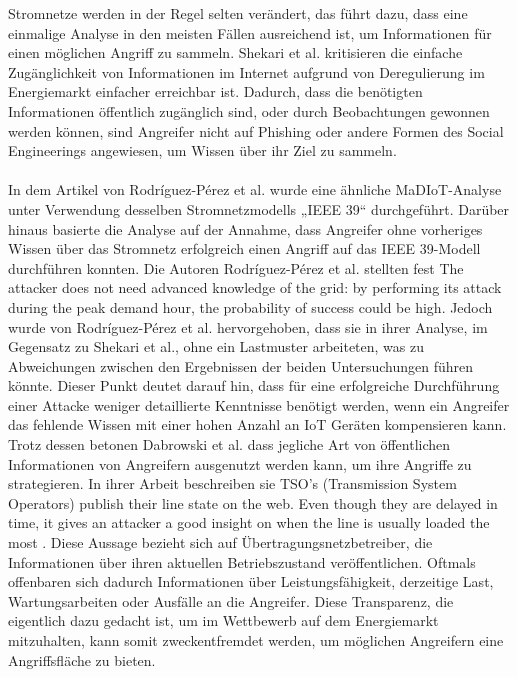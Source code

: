 \documentclass[
    a4paper,
    pagesize,
	pdftex,
    12pt,
]{scrartcl}
\begin{document}
\begin{multicols}{2}
Stromnetze werden in der Regel selten verändert, das führt dazu, dass eine einmalige Analyse in den meisten Fällen ausreichend ist, um Informationen für einen möglichen Angriff zu sammeln. Shekari et al. kritisieren die einfache Zugänglichkeit von Informationen im Internet aufgrund von Deregulierung im Energiemarkt einfacher erreichbar ist\cite{280016}. Dadurch, dass die benötigten Informationen öffentlich zugänglich sind, oder durch Beobachtungen gewonnen werden können, sind Angreifer nicht auf Phishing oder andere Formen des Social Engineerings angewiesen, um Wissen über ihr Ziel zu sammeln.\\ \\In dem Artikel von Rodríguez-Pérez et al. wurde eine ähnliche MaDIoT-Analyse unter Verwendung desselben Stromnetzmodells „IEEE 39“ durchgeführt. Darüber hinaus basierte die Analyse auf der Annahme, dass Angreifer ohne vorheriges Wissen über das Stromnetz erfolgreich einen Angriff auf das IEEE 39-Modell durchführen konnten\cite{Confronting_the_Threat}. Die Autoren Rodríguez-Pérez et al. stellten fest \glqq The attacker does not need advanced knowledge of the grid: by performing its attack during the peak demand hour, the probability of success could be high\grqq{}\cite{Confronting_the_Threat}. Jedoch wurde von Rodríguez-Pérez et al. hervorgehoben, dass sie in ihrer Analyse, im Gegensatz zu Shekari et al., ohne ein Lastmuster arbeiteten, was zu Abweichungen zwischen den Ergebnissen der beiden Untersuchungen führen könnte. Dieser Punkt deutet darauf hin, dass für eine erfolgreiche Durchführung einer Attacke weniger detaillierte Kenntnisse benötigt werden, wenn ein Angreifer das fehlende Wissen mit einer hohen Anzahl an IoT Geräten kompensieren kann. Trotz dessen betonen Dabrowski et al. dass jegliche Art von öffentlichen Informationen von Angreifern ausgenutzt werden kann, um ihre Angriffe zu strategieren.\cite{inproceedings} In ihrer Arbeit beschreiben sie \glqq TSO’s (Transmission System Operators) publish their line state on the web. Even though they are delayed in time, it gives an attacker a good insight on when the line is usually loaded the most\grqq{} \cite{inproceedings}. Diese Aussage bezieht sich auf Übertragungsnetzbetreiber, die Informationen über ihren aktuellen Betriebszustand veröffentlichen. Oftmals offenbaren sich dadurch Informationen über Leistungsfähigkeit, derzeitige Last, Wartungsarbeiten oder Ausfälle an die Angreifer. Diese Transparenz, die eigentlich dazu gedacht ist, um im Wettbewerb auf dem Energiemarkt mitzuhalten, kann somit zweckentfremdet werden, um möglichen Angreifern eine Angriffsfläche zu bieten. 

\end{multicols}
\end{document}

